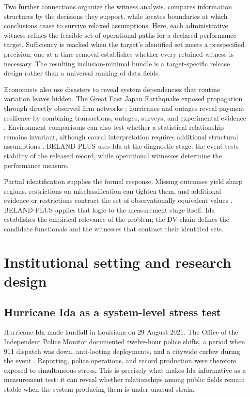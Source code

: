 \documentclass[11pt]{article}
\begin{document}
Two further connections organize the witness analysis. \citet{Blackwell1953} compares information structures by the decisions they support, while \citet{MastenPoirier2020} locates boundaries at which conclusions cease to survive relaxed assumptions. Here, each administrative witness refines the feasible set of operational paths for a declared performance target. Sufficiency is reached when the target's identified set meets a prespecified precision; one-at-a-time removal establishes whether every retained witness is necessary. The resulting inclusion-minimal bundle is a target-specific release design rather than a universal ranking of data fields.

Economists also use disasters to reveal system dependencies that routine variation leaves hidden. The Great East Japan Earthquake exposed propagation through directly observed firm networks \citep{CarvalhoNireiSaitoTahbazSalehi2021}; hurricanes and outages reveal payment resilience by combining transactions, outages, surveys, and experimental evidence \citep{AlvarezArgenteVanPatten2026}. Environment comparisons can also test whether a statistical relationship remains invariant, although causal interpretation requires additional structural assumptions \citep{PetersBuhlmannMeinshausen2016}. BELAND-PLUS uses Ida at the diagnostic stage: the event tests stability of the released record, while operational witnesses determine the performance measure.

Partial identification supplies the formal response. Missing outcomes yield sharp regions, restrictions on misclassification can tighten them, and additional evidence or restrictions contract the set of observationally equivalent values \citep{Manski1990,Manski2003,HorowitzManski1995,Molinari2008,Molinari2020,Tamer2010}. BELAND-PLUS applies that logic to the measurement stage itself. Ida establishes the empirical relevance of the problem; the DV chain defines the candidate functionals and the witnesses that contract their identified sets.

\section{Institutional setting and research design}

\subsection{Hurricane Ida as a system-level stress test}

Hurricane Ida made landfall in Louisiana on 29 August 2021. The Office of the Independent Police Monitor documented twelve-hour police shifts, a period when 911 dispatch was down, anti-looting deployments, and a citywide curfew during the event \citep{OIPM2021}. Reporting, police operations, and record production were therefore exposed to simultaneous stress. This is precisely what makes Ida informative as a measurement test: it can reveal whether relationships among public fields remain stable when the system producing them is under unusual strain.
\end{document}

